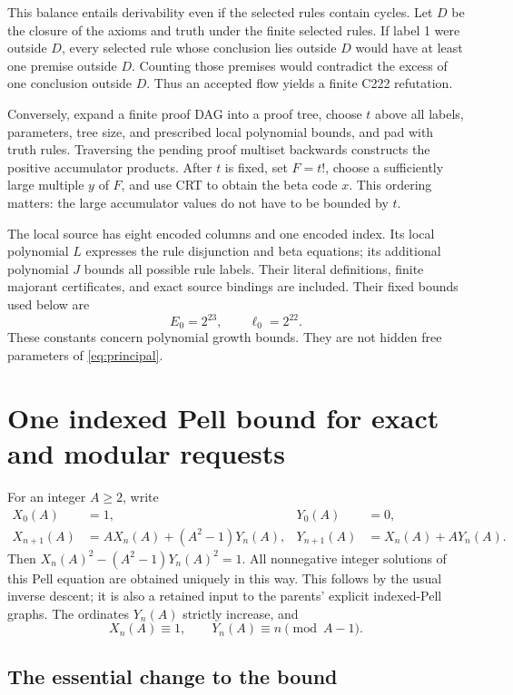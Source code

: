 \documentclass[11pt,letterpaper]{article}
\theoremstyle{remark}\newtheorem{remark}[theorem]{Remark}
\begin{document}
This balance entails derivability even if the selected rules contain
cycles.  Let $D$ be the closure of the axioms and truth under the finite
selected rules.  If label 1 were outside $D$, every selected rule whose
conclusion lies outside $D$ would have at least one premise outside $D$.
Counting those premises would contradict the excess of one conclusion
outside $D$.  Thus an accepted flow yields a finite C222 refutation.

Conversely, expand a finite proof DAG into a proof tree, choose $t$ above
all labels, parameters, tree size, and prescribed local polynomial
bounds, and pad with truth rules.  Traversing the pending proof multiset
backwards constructs the positive accumulator products.  After $t$ is
fixed, set $F=t!$, choose a sufficiently large multiple $y$ of $F$, and
use CRT to obtain the beta code $x$.  This ordering matters: the large
accumulator values do not have to be bounded by $t$.

The local source has eight encoded columns and one encoded index.  Its
local polynomial $L$ expresses the rule disjunction and beta equations;
its additional polynomial $J$ bounds all possible rule labels.  Their
literal definitions, finite majorant certificates, and exact source
bindings are included.  Their fixed bounds used below are
\[
 E_0=2^{23},\qquad \ell_0=2^{22}.
\]
These constants concern polynomial growth bounds.  They are not hidden
free parameters of \eqref{eq:principal}.

\section{One indexed Pell bound for exact and modular requests}

For an integer $A\ge2$, write
\begin{align*}
 X_0(A)&=1,&Y_0(A)&=0,\\
 X_{n+1}(A)&=AX_n(A)+(A^2-1)Y_n(A),&
 Y_{n+1}(A)&=X_n(A)+AY_n(A).
\end{align*}
Then $X_n(A)^2-(A^2-1)Y_n(A)^2=1$.  All nonnegative integer solutions
of this Pell equation are obtained uniquely in this way.  This follows
by the usual inverse descent; it is also a retained input to the
parents' explicit indexed-Pell graphs.  The ordinates $Y_n(A)$ strictly
increase, and
\begin{equation}\label{eq:pell-congruence}
 X_n(A)\equiv1,\qquad Y_n(A)\equiv n\pmod{A-1}.
\end{equation}

\subsection{The essential change to the bound}
\end{document}
